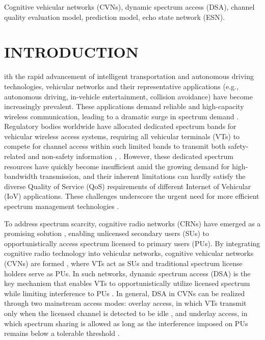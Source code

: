 \documentclass[journal]{IEEEtran}
\begin{document}
\begin{IEEEkeywords}
	Cognitive vehicular networks (CVNs), dynamic spectrum access (DSA), channel quality evaluation model, prediction model, echo state network (ESN).
\end{IEEEkeywords}
\section{INTRODUCTION}
 {ith} the rapid advancement of intelligent transportation and autonomous driving technologies, vehicular networks and their representative applications (e.g., autonomous driving, in-vehicle entertainment, collision avoidance) have become increasingly prevalent. These applications demand reliable and high-capacity wireless communication, leading to a dramatic surge in spectrum demand \cite{ref1}. Regulatory bodies worldwide have allocated dedicated spectrum bands for vehicular wireless access systems, requiring all vehicular terminals (VTs) to compete for channel access within such limited bands to transmit both safety-related and non-safety information \cite{ref2}, \cite{ref3}. However, these dedicated spectrum resources have quickly become insufficient amid the growing demand for high-bandwidth transmission, and their inherent limitations can hardly satisfy the diverse Quality of Service (QoS) requirements of different Internet of Vehicular (IoV) applications. These challenges underscore the urgent need for more efficient spectrum management technologies \cite{ref4}.
\par
To address spectrum scarcity, cognitive radio networks (CRNs) have emerged as a promising solution \cite{ref5}, enabling unlicensed secondary users (SUs) to opportunistically access spectrum licensed to primary users (PUs). By integrating cognitive radio technology into vehicular networks, cognitive vehicular networks (CVNs) are formed \cite{ref6}, where VTs act as SUs and traditional spectrum license holders serve as PUs. In such networks, dynamic spectrum access (DSA) is the key mechanism that enables VTs to opportunistically utilize licensed spectrum while limiting interference to PUs \cite{ref7}. In general, DSA in CVNs can be realized through two mainstream access modes: overlay access, in which VTs transmit only when the licensed channel is detected to be idle \cite{ref8}, and underlay access, in which spectrum sharing is allowed as long as the interference imposed on PUs remains below a tolerable threshold \cite{ref9}.
\par
\end{document}
